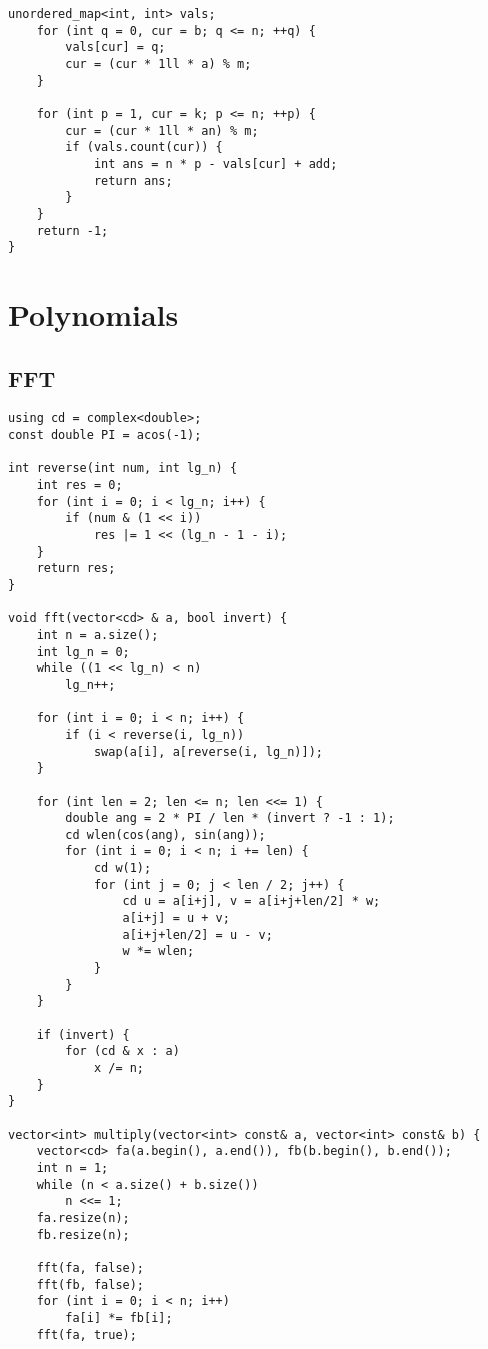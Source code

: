 \documentclass[10pt]{article}
\begin{document}
\begin{multicols*}{2}
\begin{lstlisting}[style=compactcpp]
    unordered_map<int, int> vals;
    for (int q = 0, cur = b; q <= n; ++q) {
        vals[cur] = q;
        cur = (cur * 1ll * a) % m;
    }

    for (int p = 1, cur = k; p <= n; ++p) {
        cur = (cur * 1ll * an) % m;
        if (vals.count(cur)) {
            int ans = n * p - vals[cur] + add;
            return ans;
        }
    }
    return -1;
}
\end{lstlisting}

\section{Polynomials}

\subsection{FFT}

\begin{lstlisting}[style=compactcpp]
using cd = complex<double>;
const double PI = acos(-1);

int reverse(int num, int lg_n) {
    int res = 0;
    for (int i = 0; i < lg_n; i++) {
        if (num & (1 << i))
            res |= 1 << (lg_n - 1 - i);
    }
    return res;
}

void fft(vector<cd> & a, bool invert) {
    int n = a.size();
    int lg_n = 0;
    while ((1 << lg_n) < n)
        lg_n++;

    for (int i = 0; i < n; i++) {
        if (i < reverse(i, lg_n))
            swap(a[i], a[reverse(i, lg_n)]);
    }

    for (int len = 2; len <= n; len <<= 1) {
        double ang = 2 * PI / len * (invert ? -1 : 1);
        cd wlen(cos(ang), sin(ang));
        for (int i = 0; i < n; i += len) {
            cd w(1);
            for (int j = 0; j < len / 2; j++) {
                cd u = a[i+j], v = a[i+j+len/2] * w;
                a[i+j] = u + v;
                a[i+j+len/2] = u - v;
                w *= wlen;
            }
        }
    }

    if (invert) {
        for (cd & x : a)
            x /= n;
    }
}

vector<int> multiply(vector<int> const& a, vector<int> const& b) {
    vector<cd> fa(a.begin(), a.end()), fb(b.begin(), b.end());
    int n = 1;
    while (n < a.size() + b.size()) 
        n <<= 1;
    fa.resize(n);
    fb.resize(n);

    fft(fa, false);
    fft(fb, false);
    for (int i = 0; i < n; i++)
        fa[i] *= fb[i];
    fft(fa, true);


\end{lstlisting}
\end{multicols*}
\end{document}
